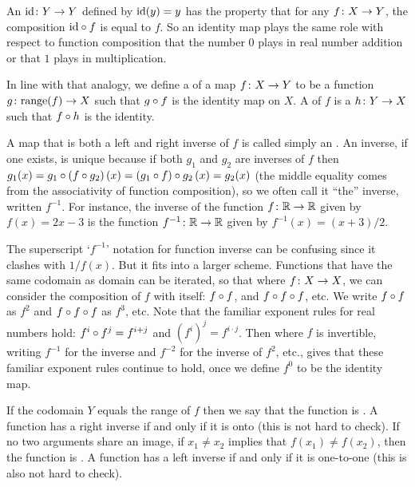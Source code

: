 An 
\( \mbox{$\mbox{id}\colon Y\to Y$} \) defined by
\( \mbox{id}(y)=y \) has the property that for any \( \mbox{$f\colon X\to Y$} \),
the composition \( \mbox{id}\mathbin{\circ} f \) is equal to \( f \).
So an identity map plays the same role with respect to function composition
that the number \( 0 \) plays in real number addition or that 
\( 1 \) plays in multiplication.

In line with that analogy, we define a
 of a map 
\( \mbox{$f\colon X\to Y$} \) to be a
function \( \mbox{$g\colon \text{range}(f)\to X$} \) such that \( g\mathbin{\circ} f \)
is the identity map on \( X \).
A  of \( f \) is a
\( \mbox{$h\colon Y\to X$} \) such that \( f\mathbin{\circ} h \) is the identity.

A map that is both a left and right inverse of \( f \)
is called simply an 
.
An inverse, if one exists, is unique because if both \( g_1 \) and
\( g_2 \) are inverses of \( f \) then
\( g_1(x)=g_1\mathbin{\circ}  (f\mathbin{\circ} g_2)\,(x)
         =(g_1\mathbin{\circ} f) \mathbin{\circ} g_2\,(x)
         =g_2(x) \)
(the middle equality comes from the associativity of function composition),
so we often call it ``the'' inverse, written \( f^{-1} \).
For instance, the inverse of the function \( \mbox{$f\colon \mathbb{R}\to \mathbb{R}$} \)
given by \( f(x)=2x-3 \) is the function \( \mbox{$f^{-1}\colon \mathbb{R}\to \mathbb{R}$} \)
given by \( f^{-1}(x)=(x+3)/2 \).

The superscript `\( f^{-1} \)' notation for function inverse can be 
confusing since it clashes with \( 1/f(x) \).
But it fits into a larger scheme.
Functions that have the same codomain as domain can be iterated,
so that where $\mbox{$f\colon X\to X$}$, we can consider
the composition of $f$ with itself: \( f\mathbin{\circ} f \), 
and \( f\mathbin{\circ} f\mathbin{\circ} f \), etc.
We 
write $f\mathbin{\circ} f$ as \( f^2 \) and 
$f\mathbin{\circ} f\mathbin{\circ} f$ as \( f^3 \), etc.
Note that the familiar exponent rules for real numbers hold:
\( f^i\mathbin{\circ} f^j=f^{i+j} \) and \( (f^i)^j=f^{i\cdot j} \).
Then where \( f \) is invertible,
writing \( f^{-1} \) for the inverse
and \( f^{-2} \) for the inverse of \( f^2 \), etc., gives that
these familiar exponent rules continue to hold, once we define
\( f^0 \) to be the identity map.

If the codomain \( Y \) equals the range of \( f \) then 
we say that the function is
.
A function has a right inverse if and only if it is onto 
(this is not hard to check).
If no two arguments share an image, if
\( x_1\neq x_2 \) implies  that \( f(x_1)\neq f(x_2) \), then the function is
.
A function has a left inverse if and only if it is one-to-one (this is also 
not hard to check).

